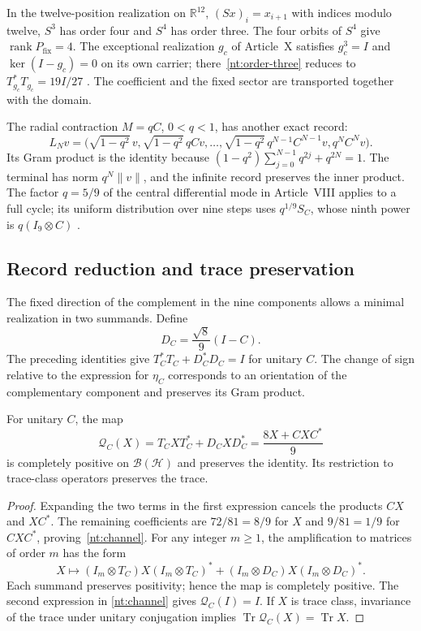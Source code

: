 In the twelve-position realization on
\(\mathbb R^{12}\), \((Sx)_i=x_{i+1}\) with indices modulo
twelve, \(S^3\) has order four and \(S^4\) has order three.
The four orbits of \(S^4\) give
\(\operatorname{rank}P_{\mathrm{fix}}=4\).
The exceptional realization \(g_c\) of Article~X satisfies
\(g_c^3=I\) and \(\ker(I-g_c)=0\) on its own carrier;
there~\eqref{nt:order-three} reduces to
\(T_{g_c}^*T_{g_c}=19I/27\)
\cite{hmtX}. The coefficient and the fixed sector are transported
together with the domain.

The radial contraction \(M=qC\), \(0<q<1\), has another exact
record:
\begin{equation}
 L_Nv=\bigl(\sqrt{1-q^2}\,v,
 \sqrt{1-q^2}\,qCv,\ldots,
 \sqrt{1-q^2}\,q^{N-1}C^{N-1}v,q^NC^Nv\bigr).
 \label{nt:radial-record}
\end{equation}
Its Gram product is the identity because
\((1-q^2)\sum_{j=0}^{N-1}q^{2j}+q^{2N}=1\).
The terminal has norm \(q^N\|v\|\), and the infinite record
preserves the inner product. The factor \(q=5/9\) of the central
differential mode in Article~VIII applies to a full
cycle; its uniform distribution over nine steps uses
\(q^{1/9}S_C\), whose ninth power is
\(q(I_9\otimes C)\) \cite{HMT-VIII}.

\subsection{Record reduction and trace preservation}

The fixed direction of the complement in the nine components
allows a minimal realization in two summands. Define
\[
 D_C=\frac{\sqrt8}{9}(I-C).
\]
The preceding identities give
\(T_C^*T_C+D_C^*D_C=I\) for unitary \(C\).
The change of sign relative to the expression for
\(\eta_C\) corresponds to an orientation of the complementary
component and preserves its Gram product.

\begin{proposition}
For unitary \(C\), the map
\begin{equation}
 \mathcal Q_C(X)=T_CXT_C^*+D_CXD_C^*
              =\frac{8X+CXC^*}{9}
 \label{nt:channel}
\end{equation}
is completely positive on \(\mathcal B(\mathcal H)\) and
preserves the identity. Its restriction to trace-class
operators preserves the trace.
\end{proposition}

\begin{proof}
Expanding the two terms in the first expression
cancels the products \(CX\) and \(XC^*\). The remaining
coefficients are \(72/81=8/9\) for \(X\) and \(9/81=1/9\)
for \(CXC^*\), proving~\eqref{nt:channel}.
For any integer \(m\geq1\), the amplification to matrices
of order \(m\) has the form
\[
 X\longmapsto
 (I_m\otimes T_C)X(I_m\otimes T_C)^*
 +(I_m\otimes D_C)X(I_m\otimes D_C)^*.
\]
Each summand preserves positivity; hence the map is
completely positive. The second expression in
\eqref{nt:channel} gives \(\mathcal Q_C(I)=I\).
If \(X\) is trace class, invariance of the trace under
unitary conjugation implies
\(\operatorname{Tr}\mathcal Q_C(X)=\operatorname{Tr}X\).
\end{proof}

